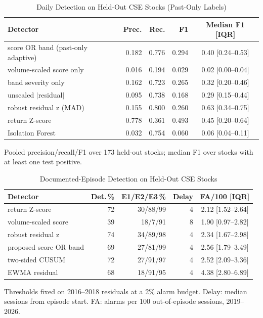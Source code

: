 \begin{table}[!t]
\caption{Daily Detection on Held-Out CSE Stocks (Past-Only Labels)}
\label{tab:ms_daily}
\centering\footnotesize\setlength{\tabcolsep}{2.4pt}
\begin{tabular}{@{}lrrrc@{}}
\toprule
Detector & Prec. & Rec. & F1 & Median F1 [IQR] \\
\midrule
score OR band (past-only adaptive) & 0.182 & 0.776 & 0.294 & 0.40 [0.24--0.53] \\
volume-scaled score only & 0.016 & 0.194 & 0.029 & 0.02 [0.00--0.04] \\
band severity only & 0.162 & 0.723 & 0.265 & 0.32 [0.20--0.46] \\
unscaled $|$residual$|$ & 0.095 & 0.738 & 0.168 & 0.29 [0.15--0.44] \\
robust residual z (MAD) & 0.155 & 0.800 & 0.260 & 0.63 [0.34--0.75] \\
return Z-score & 0.778 & 0.361 & 0.493 & 0.45 [0.20--0.64] \\
Isolation Forest & 0.032 & 0.754 & 0.060 & 0.06 [0.04--0.11] \\
\bottomrule
\end{tabular}
\vspace{2pt}
\parbox{\columnwidth}{\scriptsize Pooled precision/recall/F1 over 173 held-out stocks; median F1 over stocks with at least one test positive.}
\end{table}

\begin{table}[!t]
\caption{Documented-Episode Detection on Held-Out CSE Stocks}
\label{tab:ms_episodes}
\centering\footnotesize\setlength{\tabcolsep}{2.6pt}
\begin{tabular}{@{}lrrrc@{}}
\toprule
Detector & Det.\,\% & E1/E2/E3\,\% & Delay & FA/100 [IQR] \\
\midrule
return Z-score & 72 & 30/88/99 & 4 & 2.12 [1.52--2.64] \\
volume-scaled score & 39 & 18/7/91 & 8 & 1.90 [0.97--2.82] \\
robust residual z & 74 & 34/89/98 & 4 & 2.34 [1.67--2.98] \\
proposed score OR band & 69 & 27/81/99 & 4 & 2.56 [1.79--3.49] \\
two-sided CUSUM & 72 & 27/91/97 & 4 & 2.52 [2.09--3.36] \\
EWMA residual & 68 & 18/91/95 & 4 & 4.38 [2.80--6.89] \\
\bottomrule
\end{tabular}
\vspace{2pt}
\parbox{\columnwidth}{\scriptsize Thresholds fixed on 2016--2018 residuals at a 2\% alarm budget. Delay: median sessions from episode start. FA: alarms per 100 out-of-episode sessions, 2019--2026.}
\end{table}

